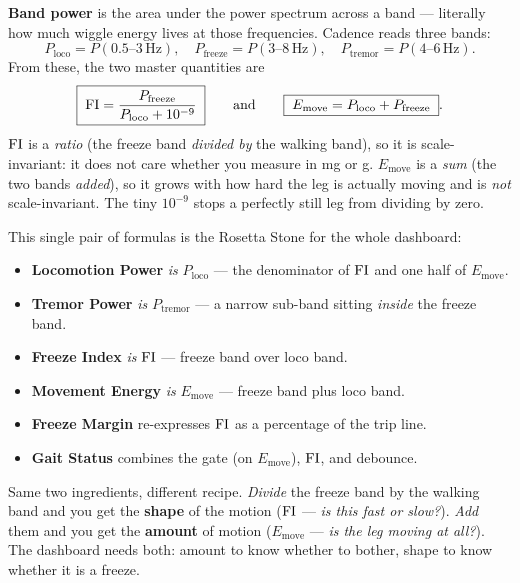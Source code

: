 \begin{mathsbox}
\textbf{Band power} is the area under the power spectrum across a band --- literally how
much wiggle energy lives at those frequencies. Cadence reads three bands:
\[
P_{\text{loco}} = P(0.5\text{--}3\,\text{Hz}),\quad
P_{\text{freeze}} = P(3\text{--}8\,\text{Hz}),\quad
P_{\text{tremor}} = P(4\text{--}6\,\text{Hz}).
\]
From these, the two master quantities are
\[
\boxed{\;\mathrm{FI} = \dfrac{P_{\text{freeze}}}{P_{\text{loco}}+10^{-9}}\;}
\qquad\text{and}\qquad
\boxed{\;E_{\text{move}} = P_{\text{loco}} + P_{\text{freeze}}\;}.
\]
$\mathrm{FI}$ is a \emph{ratio} (the freeze band \emph{divided by} the walking band), so it is
scale-invariant: it does not care whether you measure in mg or g. $E_{\text{move}}$ is a
\emph{sum} (the two bands \emph{added}), so it grows with how hard the leg is actually
moving and is \emph{not} scale-invariant. The tiny $10^{-9}$ stops a perfectly still leg
from dividing by zero.
\end{mathsbox}

This single pair of formulas is the Rosetta Stone for the whole dashboard:

\begin{itemize}
\item \textbf{Locomotion Power} \emph{is} $P_{\text{loco}}$ --- the denominator of $\mathrm{FI}$
  and one half of $E_{\text{move}}$.
\item \textbf{Tremor Power} \emph{is} $P_{\text{tremor}}$ --- a narrow sub-band sitting
  \emph{inside} the freeze band.
\item \textbf{Freeze Index} \emph{is} $\mathrm{FI}$ --- freeze band over loco band.
\item \textbf{Movement Energy} \emph{is} $E_{\text{move}}$ --- freeze band plus loco band.
\item \textbf{Freeze Margin} re-expresses $\mathrm{FI}$ as a percentage of the trip line.
\item \textbf{Gait Status} combines the gate (on $E_{\text{move}}$), $\mathrm{FI}$, and debounce.
\end{itemize}

\begin{keyidea}
Same two ingredients, different recipe. \emph{Divide} the freeze band by the walking
band and you get the \textbf{shape} of the motion ($\mathrm{FI}$ --- \emph{is this fast or
slow?}). \emph{Add} them and you get the \textbf{amount} of motion ($E_{\text{move}}$
--- \emph{is the leg moving at all?}). The dashboard needs both: amount to know whether
to bother, shape to know whether it is a freeze.
\end{keyidea}

